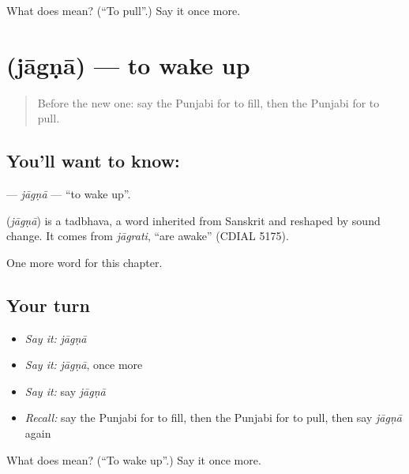 \begin{tcolorbox}[breakable,colback=teal!4,colframe=teal!35!black,title={Before you move on}]
What does  mean? (\textquotedblleft{}To pull\textquotedblright{}.) Say it once more.
\end{tcolorbox}
\section[\texorpdfstring{\pa{ਜਾਗਣਾ} (jāgṇā)}{ਜਾਗਣਾ (jāgṇā)}]{ (jāgṇā) — to wake up}

\label{lesson:PA-C150-jagna}



\begin{quote}
Before the new one: say the Punjabi for to fill, then the Punjabi for to pull.
\end{quote}

\subsection*{You'll want to know: }
\textbf{} — \emph{jāgṇā} — \textquotedblleft{}to wake up\textquotedblright{}.

\begin{cousinweb}
\textbf{} (\emph{jāgṇā}) is a tadbhava, a word inherited from Sanskrit and reshaped by sound change. It comes from \emph{jāgrati}, \textquotedblleft{}are awake\textquotedblright{} (CDIAL 5175).
\end{cousinweb}

\begin{grammarlens}[title={What you've built}]
One more word for this chapter.
\end{grammarlens}

\subsection*{Your turn}
\begin{itemize}
\raggedright
  \item \emph{Say it:} \emph{jāgṇā}
  \item \emph{Say it:} \emph{jāgṇā}, once more
  \item \emph{Say it:} say \emph{jāgṇā}
  \item \emph{Recall:} say the Punjabi for to fill, then the Punjabi for to pull, then say \emph{jāgṇā} again
\end{itemize}

\begin{tcolorbox}[breakable,colback=teal!4,colframe=teal!35!black,title={Before you move on}]
What does  mean? (\textquotedblleft{}To wake up\textquotedblright{}.) Say it once more.
\end{tcolorbox}
